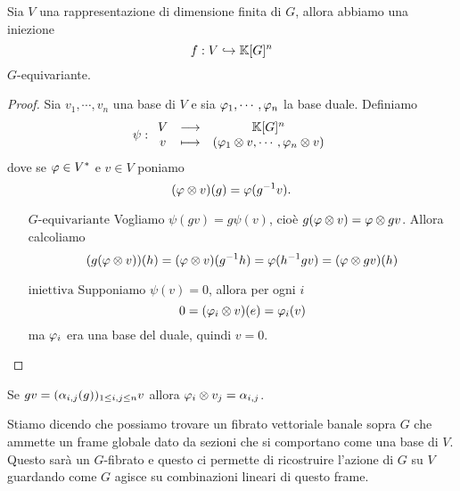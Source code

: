 \begin{lemma}\label{LmIniezioneRappresentazioniFiniteInPotenzaAnelloCoordinateDiG}
Sia $V$ una rappresentazione di dimensione finita di $G$, allora abbiamo una iniezione
\[f:V\hookrightarrow \mathbb{K}[G]^n\]
$G$-equivariante.
\end{lemma}
\begin{proof}
Sia $v_1,\cdots, v_n$ una base di $V$ e sia $\varphi_1,\cdots, \varphi_n$ la base duale. Definiamo
\[\psi:\begin{array}{ccc} {V} & \longrightarrow & {\mathbb{K}[G]^n}\\ {v} & \longmapsto & {(\varphi_1\otimes v,\cdots, \varphi_n\otimes v)} \end{array}\]
dove se $\varphi\in V^\ast$ e $v\in V$ poniamo
\[(\varphi\otimes v)(g)=\varphi(g^{-1} v).\]
\setlength{\leftmargini}{0cm}
\begin{itemize}
\item[$\boxed{G\text{-equivariante}}$] Vogliamo $\psi(gv)=g\psi(v)$, cio\`e $g(\varphi\otimes v)=\varphi\otimes gv$. Allora calcoliamo
\[(g(\varphi\otimes v))(h)=(\varphi\otimes v)(g^{-1} h)=\varphi(h^{-1} g v)=(\varphi\otimes gv)(h)\]
\item[$\boxed{\text{iniettiva}}$] Supponiamo $\psi(v)=0$, allora per ogni $i$
\[0=(\varphi_i\otimes v)(e)=\varphi_i(v)\]
ma $\varphi_i$ era una base del duale, quindi $v=0$.
\end{itemize}
\setlength{\leftmargini}{0.5cm}
\end{proof}

\begin{remark}
Se $gv=(\alpha_{i,j}(g))_{1\leq i,j\leq n} v$ allora $\varphi_i\otimes v_j=\alpha_{i,j}$.
\end{remark}


\begin{remark}
Stiamo dicendo che possiamo trovare un fibrato vettoriale banale sopra $G$ che ammette un frame globale dato da sezioni che si comportano come una base di $V$. Questo sar\`a un $G$-fibrato e questo ci permette di ricostruire l'azione di $G$ su $V$ guardando come $G$ agisce su combinazioni lineari di questo frame.
\end{remark}


